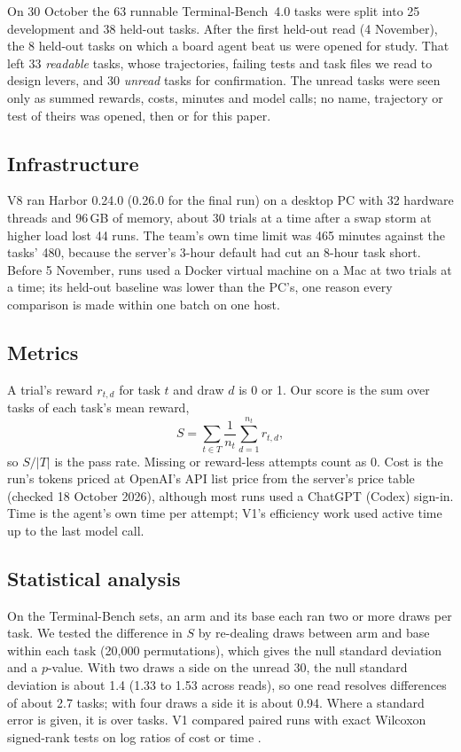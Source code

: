  On 30 October the 63 runnable Terminal-Bench~4.0 tasks were split into 25
development and 38 held-out tasks. After the first held-out read (4 November), the 8 held-out tasks
on which a board agent beat us were opened for study. That left 33 \emph{readable} tasks, whose
trajectories, failing tests and task files we read to design levers, and 30 \emph{unread} tasks for
confirmation. The unread tasks were seen only as summed rewards, costs, minutes and model calls; no
name, trajectory or test of theirs was opened, then or for this paper.

\subsection{Infrastructure}

V8 ran Harbor 0.24.0 (0.26.0 for the final run) \citep{harbor2026} on a desktop PC with 32 hardware
threads and 96\,GB of memory, about 30 trials at a time after a swap storm at higher load lost 44
runs. The team's own time limit was 465 minutes against the tasks' 480, because the server's
3-hour default had cut an 8-hour task short. Before 5 November, runs used a Docker virtual machine
on a Mac at two trials at a time; its held-out baseline was lower than the PC's, one reason every
comparison is made within one batch on one host.

\subsection{Metrics}

A trial's reward $r_{t,d}$ for task $t$ and draw $d$ is 0 or 1. Our score is the sum over tasks of
each task's mean reward,
\begin{equation}
  S = \sum_{t \in T} \frac{1}{n_t} \sum_{d=1}^{n_t} r_{t,d},
  \label{eq:score}
\end{equation}
so $S/|T|$ is the pass rate. Missing or reward-less attempts count as 0. Cost is the run's tokens
priced at OpenAI's API list price from the server's price table (checked 18 October 2026),
although most runs used a ChatGPT (Codex) sign-in. Time is the agent's own time per attempt; V1's
efficiency work used active time up to the last model call.

\subsection{Statistical analysis}

On the Terminal-Bench sets, an arm and its base each ran two or more draws per task. We tested the
difference in $S$ by re-dealing draws between arm and base within each task (20,000
permutations), which gives the null standard deviation and a $p$-value. With two draws a
side on the unread 30, the null standard deviation is about 1.4 (1.33 to 1.53 across reads), so one
read resolves differences of about 2.7 tasks; with four draws a side it is about 0.94. Where a
standard error is given, it is over tasks. V1 compared paired runs with exact Wilcoxon signed-rank
tests on log ratios of cost or time \citep{wilcoxon1945}.

